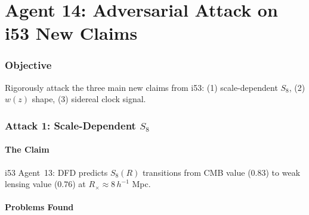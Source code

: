 \documentclass[11pt,a4paper]{article}
\begin{document}
\part{Agent 14: Adversarial Attack on i53 New Claims}
\label{part:adversarial}

\section{Objective}

Rigorously attack the three main new claims from i53: (1) scale-dependent $S_8$, (2) $w(z)$ shape, (3) sidereal clock signal.

\section{Attack 1: Scale-Dependent $S_8$}

\subsection{The Claim}

i53 Agent~13: DFD predicts $S_8(R)$ transitions from CMB value ($0.83$) to weak lensing value ($0.76$) at $R_\times \approx 8\,h^{-1}$ Mpc.

\subsection{Problems Found}
\end{document}
